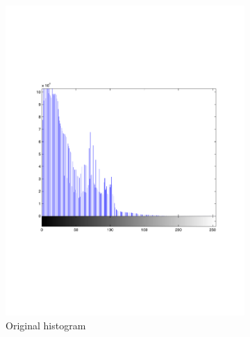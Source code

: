 \documentclass[a4paper]{article}
\begin{document}
\begin{figure}[ht]
        \begin{subfigure}[b]{0.3\textwidth}
                \centering
                \includegraphics[width=\textwidth]{q4-c-orighist}
                \caption{Original histogram}
                \label{fig:bhe2}
        \end{subfigure}%
        \begin{subfigure}[b]{0.3\textwidth}
                \centering

\end{subfigure}
\end{figure}
\end{document}
